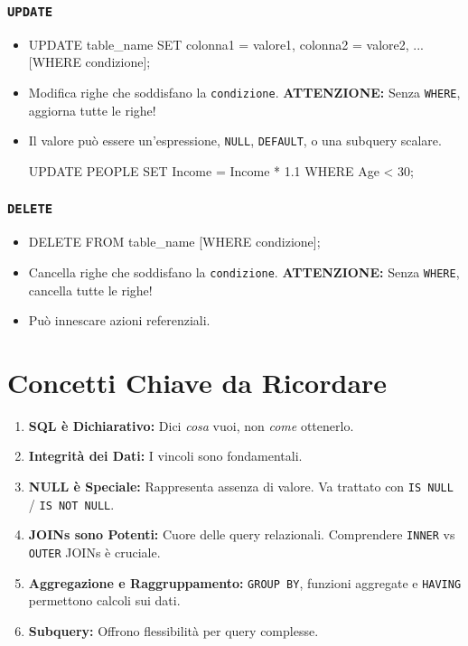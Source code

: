 \documentclass{article}
\begin{document}
	\subsubsection{\texttt{UPDATE}}
	\begin{itemize}
		\item
		\begin{sqlcode}
			UPDATE table_name
			SET colonna1 = valore1, colonna2 = valore2, ...
			[WHERE condizione];
		\end{sqlcode}
		\item Modifica righe che soddisfano la \texttt{condizione}. \textbf{ATTENZIONE:} Senza \texttt{WHERE}, aggiorna tutte le righe!
		\item Il valore può essere un'espressione, \texttt{NULL}, \texttt{DEFAULT}, o una subquery scalare.
		\begin{sqlcode}
			UPDATE PEOPLE SET Income = Income * 1.1 WHERE Age < 30;
		\end{sqlcode}
	\end{itemize}
	
	\subsubsection{\texttt{DELETE}}
	\begin{itemize}
		\item
		\begin{sqlcode}
			DELETE FROM table_name [WHERE condizione];
		\end{sqlcode}
		\item Cancella righe che soddisfano la \texttt{condizione}. \textbf{ATTENZIONE:} Senza \texttt{WHERE}, cancella tutte le righe!
		\item Può innescare azioni referenziali.
	\end{itemize}
	
	\section{Concetti Chiave da Ricordare}
	\begin{enumerate}
		\item \textbf{SQL è Dichiarativo:} Dici \textit{cosa} vuoi, non \textit{come} ottenerlo.
		\item \textbf{Integrità dei Dati:} I vincoli sono fondamentali.
		\item \textbf{NULL è Speciale:} Rappresenta assenza di valore. Va trattato con \texttt{IS NULL} / \texttt{IS NOT NULL}.
		\item \textbf{JOINs sono Potenti:} Cuore delle query relazionali. Comprendere \texttt{INNER} vs \texttt{OUTER} JOINs è cruciale.
		\item \textbf{Aggregazione e Raggruppamento:} \texttt{GROUP BY}, funzioni aggregate e \texttt{HAVING} permettono calcoli sui dati.
		\item \textbf{Subquery:} Offrono flessibilità per query complesse.
	\end{enumerate}
	
\end{document}
